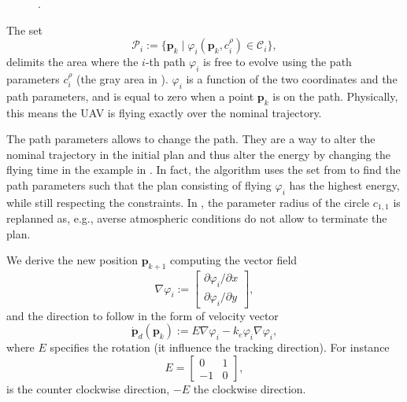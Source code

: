 \begin{figure}[h]
  \centering
  
  \caption[External interference on the path]{.}
  \label{fig:tee1}
\end{figure}


The set
\begin{equation}\label{eq:area}
  \mathcal{P}_i:=\{\mathbf{p}_k\mid\varphi_i(\mathbf{p}_k,c_{i}^\rho)\in\mathcal{C}_i\},
\end{equation}
delimits the area where the $i$-th path $\varphi_i$ is free to evolve using the path parameters $c_i^\rho$ (the gray area in ). $\varphi_i$ is a function of the two coordinates and the path parameters, and is equal to zero when a point $\mathbf{p}_k$ is on the path. Physically, this means the UAV is flying exactly over the nominal trajectory. 

The path parameters allows to change the path. They are a way to alter the nominal trajectory in the initial plan and thus alter the energy by changing the flying time in the example in .
In fact, the algorithm uses the set from  to find the path parameters such that the plan consisting of flying $\varphi_i$ has the highest energy, while still respecting the constraints. In , the parameter radius of the circle $c_{1,1}$ is replanned as, e.g., averse atmospheric conditions do not allow to terminate the plan.

We derive the new position $\mathbf{p}_{k+1}$ computing the vector field 
\begin{equation}
  \nabla\varphi_i:=\begin{bmatrix}\partial\varphi_i/\partial x \\ \partial\varphi_i/\partial y\end{bmatrix},  
\end{equation}
and the direction to follow in the form of velocity vector~\cite{de2017guidance}
\begin{equation}\label{eq:pd}
  \dot{\mathbf{p}}_d(\mathbf{p}_k):=E\nabla\varphi_i-k_e\varphi_i\nabla\varphi_i,
\end{equation}
where $E$ specifies the rotation (it influence the tracking direction). For instance
\begin{equation}
  E=\begin{bmatrix}
    0&1\\-1&0
  \end{bmatrix},
\end{equation}
is the counter clockwise direction, $-E$ the clockwise direction. 

